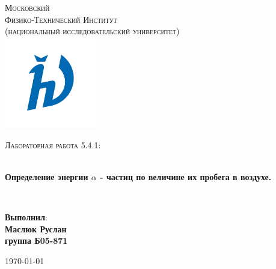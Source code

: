 \documentclass[a4paper,14pt]{extarticle}
\begin{document}
\begin{titlepage}
\begin{center}

\textsc{\LARGE Московский\\[-0.2cm]Физико-Технический Институт\\[0.1cm]\large (национальный исследовательский университет)}\\[1.5cm] 

\includegraphics[width=0.3\textwidth]{logo}

\textsc{\Large Лабораторная работа 5.4.1: \\ }

\HRule \\[0.4cm]
{ \LARGE \bfseries Определение энергии $\alpha$ - частиц по величине их пробега в воздухе. }

\HRule \\[1.5cm]

\noindent
\begin{minipage}{0.4\textwidth}
\begin{flushleft} \large
\end{flushleft}
\end{minipage}%
\begin{minipage}{0.4\textwidth}
\begin{flushright} \large
\end{flushright}
\end{minipage}

\large{\begin{flushright}
\vfill
\textbf{Выполнил}:\\
\textbf{Маслюк Руслан\\}
\textbf{группа Б05-871}
\end{flushright}}

{\large \today}\\

\end{center}
\end{titlepage}
\end{document}
